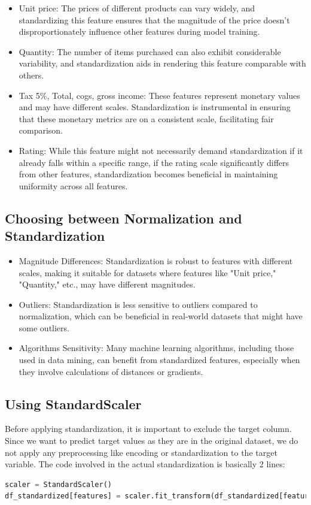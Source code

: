 \begin{itemize}
\item Unit price: The prices of different products can vary widely, and standardizing this feature ensures that the magnitude of the price doesn't disproportionately influence other features during model training.
\item Quantity: The number of items purchased can also exhibit considerable variability, and standardization aids in rendering this feature comparable with others.
\item Tax 5\%, Total, cogs, gross income: These features represent monetary values and may have different scales. Standardization is instrumental in ensuring that these monetary metrics are on a consistent scale, facilitating fair comparison.
\item Rating: While this feature might not necessarily demand standardization if it already falls within a specific range, if the rating scale significantly differs from other features, standardization becomes beneficial in maintaining uniformity across all features.
\end{itemize}

\subsection{Choosing between Normalization and Standardization}
\begin{itemize}
\item Magnitude Differences: Standardization is robust to features with different scales, making it suitable for datasets where features like "Unit price," "Quantity," etc., may have different magnitudes.
\item Outliers: Standardization is less sensitive to outliers compared to normalization, which can be beneficial in real-world datasets that might have some outliers.
\item Algorithms Sensitivity: Many machine learning algorithms, including those used in data mining, can benefit from standardized features, especially when they involve calculations of distances or gradients.
\end{itemize}


\subsection{Using StandardScaler}
Before applying standardization, it is important to exclude the target column. Since we want to predict target values as they are in the original dataset, we do not apply any preprocessing like encoding or standardization to the target variable. The code involved in the actual standardization is basically 2 lines:
\begin{lstlisting}[language=Python, frame=none]
scaler = StandardScaler()
df_standardized[features] = scaler.fit_transform(df_standardized[features])
\end{lstlisting}


